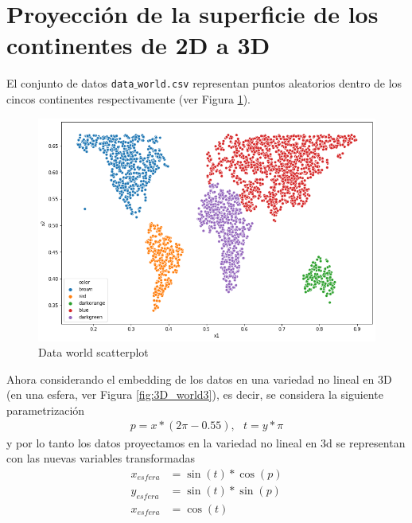 \documentclass[paper=letter, fontsize=11pt]{scrartcl}
\numberwithin{equation}{section} %
\numberwithin{figure}{section} %
\numberwithin{table}{section} %
\begin{document}
\section{Proyección de la superficie de los continentes de 2D a 3D}\label{ejercicio1}
El conjunto de datos \texttt{data$\_$world.csv} representan puntos aleatorios dentro de los cincos continentes respectivamente (ver Figura \ref{fig:2D_world}).
\begin{figure}[H]
    \centering
    \includegraphics[scale=0.3]{figure/2D_world.png}
    \caption{Data world scatterplot}
    \label{fig:2D_world}
\end{figure}
Ahora considerando el embedding de los datos en una variedad no lineal en 3D (en una esfera,  ver Figura \ref{fig:3D_world3}), es decir, se considera la siguiente parametrización
\begin{align*}
    p = x*(2\pi-0.55), \ \ \ t=y*\pi
\end{align*}
y por lo tanto los datos proyectamos en la variedad no lineal en 3d se representan con las nuevas variables transformadas
\begin{align*}
    x_{esfera} &= \sin(t)*\cos(p)\\
    y_{esfera} &= \sin(t)*\sin(p)\\
    x_{esfera} &= \cos(t)
\end{align*}
\end{document}
